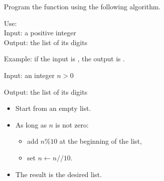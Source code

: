 \documentclass[11pt,class=report,crop=false]{standalone}
\begin{document}


\begin{activite}


Program the function  using the following algorithm.

 
   \begin{fonction}
  Use:  \\
  Input: a positive integer \\
  Output: the list of its digits
  
  \medskip
    
  Example: if the input is , the output is \ci{[1,2,3,4]}.
  \end{fonction}


  \begin{algorithme}
  Input: an integer $n>0$

  Output: the list of its digits 

  \begin{itemize}
    \item Start from an empty list.
    
    \item As long as $n$ is not zero:
    
     \begin{itemize} 
       \item add $n \% 10$ at the beginning of the list,
       \item set $n \leftarrow n//10$.
     \end{itemize}    
         
    \item The result is the desired list.
  \end{itemize} 
             
 \end{algorithme}
 
  

\end{activite}

\bigskip
\end{document}
